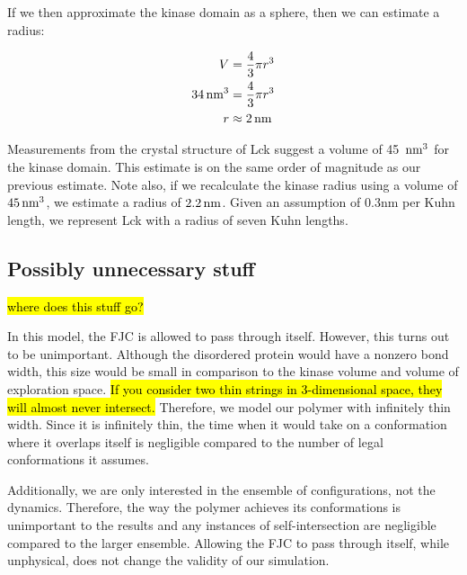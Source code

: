 \documentclass[../AdvancementSummary.tex]{subfiles}
\begin{document}
If we then approximate the kinase domain as a sphere, then we can estimate a radius: 

\begin{align*}
V &= \frac{4}{3}\pi r^3 \\
34 \,\mbox{nm}^3 &= \frac{4}{3} \pi r^3 \\
r &\approx 2 \,\mbox{nm} \\
\end{align*}

Measurements from the crystal structure of Lck suggest a volume of 45 $\,\mbox{nm}^3$ for the kinase domain.  This estimate is on the same order of magnitude as our previous estimate.  Note also, if we recalculate the kinase radius using a volume of $45 \,\mbox{nm}^3$, we estimate a radius of $2.2 \,\mbox{nm}$. Given an assumption of 0.3nm per Kuhn length, we represent Lck with a radius of seven Kuhn lengths.

\subsection{Possibly unnecessary stuff}

\hl{where does this stuff go?}

In this model, the FJC is allowed to pass through itself. However, this turns out to be unimportant. Although the disordered protein would have a nonzero bond width, this size would be small in comparison to the kinase volume and volume of exploration space.  \hl{If you consider two thin strings in 3-dimensional space, they will almost never intersect.}  Therefore, we model our polymer with infinitely thin width.  Since it is infinitely thin, the time when it would take on a conformation where it overlaps itself is negligible compared to the number of legal conformations it assumes.

Additionally, we are only interested in the ensemble of configurations, not the dynamics. Therefore, the way the polymer achieves its conformations is unimportant to the results and any instances of self-intersection are negligible compared to the larger ensemble. Allowing the FJC to pass through itself, while unphysical, does not change the validity of our simulation.


%
%
\end{document}

